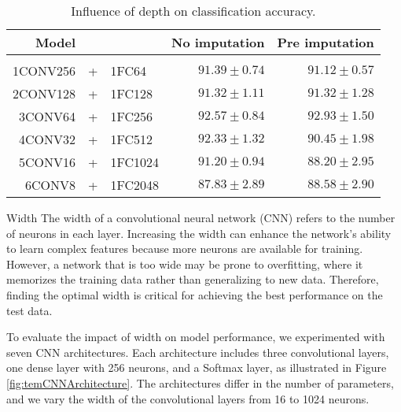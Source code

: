 \begin{table}[H]
  \centering
   \begin{tabular}{rclrr}
   Model&&                  & No imputation         & Pre imputation             \\[0.2cm]
   \hline \\[-0.2cm]
   1CONV256 &+& 1FC64   	 & $91.39 \pm 0.74$ 	 & $91.12 \pm 0.57$\\
   2CONV128 &+& 1FC128  	 & $91.32 \pm 1.11$ 	 & $91.32 \pm 1.28$\\
   3CONV64 &+& 1FC256   	 & $\mathbf{92.57 \pm 0.84}$ 	 & $\mathbf{92.93 \pm 1.50}$\\
   4CONV32 &+& 1FC512   	 & $92.33 \pm 1.32$ 	 & $90.45 \pm 1.98$\\
   5CONV16 &+& 1FC1024  	 & $91.20 \pm 0.94$ 	 & $88.20 \pm 2.95$\\
   6CONV8 &+& 1FC2048   	 & $87.83 \pm 2.89$ 	 & $88.58 \pm 2.90$\\
   \end{tabular}
   \caption{Influence of depth on classification accuracy.}
   \label{tab:temCNNdepth}
 \end{table}

\begin{paragraph}{Width}
The width of a convolutional neural network (CNN) refers to the number of neurons in each layer.
Increasing the width can enhance the network's ability to learn complex features because more neurons are available for training.
However, a network that is too wide may be prone to overfitting, where it memorizes the training data rather than generalizing to new data.
Therefore, finding the optimal width is critical for achieving the best performance on the test data.
\end{paragraph}

To evaluate the impact of width on model performance, we experimented with seven CNN architectures.
Each architecture includes three convolutional layers, one dense layer with 256 neurons, and a Softmax layer, as illustrated in Figure \ref{fig:temCNNArchitecture}.
The architectures differ in the number of parameters, and we vary the width of the convolutional layers from 16 to 1024 neurons.

